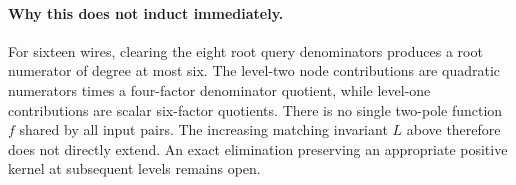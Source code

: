 \documentclass[11pt]{article}
\begin{document}
\paragraph{Why this does not induct immediately.}
For sixteen wires, clearing the eight root query denominators produces
a root numerator of degree at most six. The level-two node contributions
are quadratic numerators times a four-factor denominator quotient, while
level-one contributions are scalar six-factor quotients. There is no
single two-pole function $f$ shared by all input pairs. The increasing
matching invariant $L$ above therefore does not directly extend. An
exact elimination preserving an appropriate positive kernel at subsequent
levels remains open.
\end{document}
